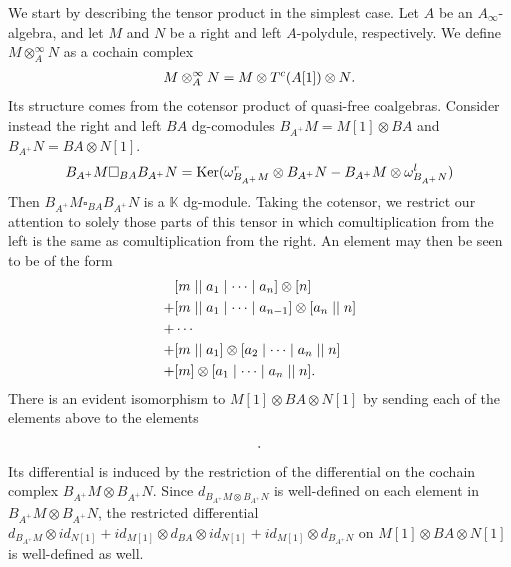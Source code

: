 \documentclass[../thesis.tex]{subfiles}
\begin{document}
            We start by describing the tensor product in the simplest case. Let $A$ be an $A_\infty$-algebra, and let $M$ and $N$ be a right and left $A$-polydule, respectively. We define $M \otimes_A^\infty N$ as a cochain complex
            \begin{align*}
                M \otimes_A^\infty N = M \otimes T^c(A[1]) \otimes N\tt{.}
            \end{align*}
            Its structure comes from the cotensor product of quasi-free coalgebras. Consider instead the right and left $BA$ dg-comodules $B_{A^+}M = M[1] \otimes BA$ and $B_{A^+}N = BA \otimes N[1]$.
            \begin{align*}
                B_{A^+}M \square_{BA} B_{A^+}N = \tt{Ker}(\omega^r_{B_{A^+}M}\otimes B_{A^+}N - B_{A^+}M \otimes \omega^l_{B_{A^+}N})
            \end{align*}
            Then $B_{A^+}M \square_{BA} B_{A^+}N$ is a $\mathbb{K}$ dg-module. Taking the cotensor, we restrict our attention to solely those parts of this tensor in which comultiplication from the left is the same as comultiplication from the right. An element may then be seen to be of the form
            \begin{align*}
                & [m \mid\mid a_1 \mid \cdots \mid a_n] \otimes [n] \\ 
                + & [m \mid\mid a_1 \mid \cdots \mid a_{n-1}]\otimes [a_n \mid\mid n] \\
                + & \cdots \\
                + & [m \mid\mid a_1] \otimes [a_2 \mid \cdots \mid a_n \mid\mid n] \\ 
                + &
                 [m]\otimes [a_1\mid\cdots \mid a_n \mid\mid n]\tt{.}
            \end{align*}
            There is an evident isomorphism to $M[1]\otimes BA \otimes N[1]$ by sending each of the elements above to the elements
            \begin{align*}
                [m \mid\mid a_1 \mid \cdots \mid a_n \mid\mid n]\tt{.}
            \end{align*}
            Its differential is induced by the restriction of the differential on the cochain complex $B_{A^+}M \otimes B_{A^+}N$. Since $d_{B_{A^+}M\otimes B_{A^+}N}$ is well-defined on each element in $B_{A^+}M \otimes B_{A^+}N$, the restricted differential $d_{B_{A^+}M} \otimes id_{N[1]} + id_{M[1]}\otimes d_{BA} \otimes id_{N[1]} + id_{M[1]}\otimes d_{B_{A^+}N}$ on $M[1] \otimes BA \otimes N[1]$ is well-defined as well.
\end{document}
